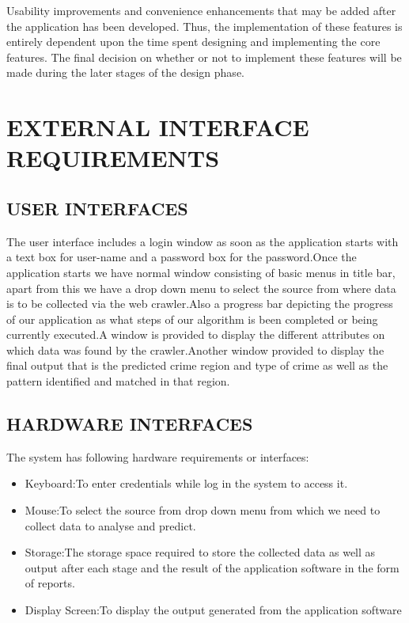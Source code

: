 \documentclass[12pt]{extreport}
\begin{document}
\noindent
Usability improvements and convenience enhancements that may be added after the application has been developed. Thus, the implementation of these features is entirely dependent upon the time spent designing and implementing the core features. The final decision on whether or not to implement these features will be made during the later stages of the design phase.


\section{EXTERNAL INTERFACE REQUIREMENTS}

 \subsection{USER INTERFACES}
\hspace*{5em}The user interface includes a login window as soon as the application starts with a text box for user-name and a password box for the password.Once the application starts we have normal window consisting of basic menus in title bar, apart from this we have a drop down menu to select the source from where data is to be collected via the web crawler.Also a progress bar depicting the progress of our application as what steps of our algorithm is been completed or being currently executed.A window is provided to display the different attributes on which data was found by the crawler.Another window provided to display the final output that is the predicted crime region and type of crime as well as the pattern identified and matched in that region.
 
 \newpage   
    \subsection{HARDWARE INTERFACES}
The system has following hardware requirements or interfaces:
\begin{itemize}
\item Keyboard:To enter credentials while log in  the system to access it.
\item Mouse:To select the source from drop down menu from which we need to collect data to analyse and predict.
\item Storage:The storage space required to store the collected data as well as output after each stage and the result of the application software in the form of reports.
\item Display Screen:To display the output generated from the application software
\end{itemize}
    
\end{document}
